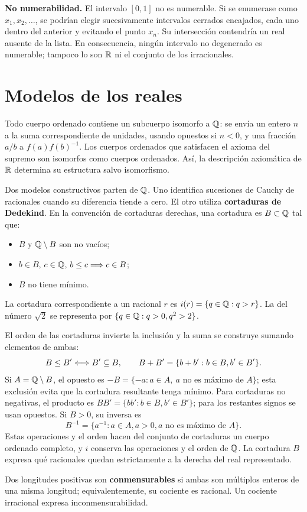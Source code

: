\textbf{No numerabilidad.} El intervalo $[0,1]$ no es numerable.
Si se enumerase como $x_1,x_2,\ldots$, se podrían elegir sucesivamente
intervalos cerrados encajados, cada uno dentro del anterior y evitando
el punto $x_n$. Su intersección contendría un real ausente de la lista.
En consecuencia, ningún intervalo no degenerado es numerable;
tampoco lo son $\mathbb{R}$ ni el conjunto de los irracionales.

\section{Modelos de los reales}
\label{sec:cortaduras}
Todo cuerpo ordenado contiene un subcuerpo isomorfo a $\mathbb{Q}$: se envía
un entero $n$ a la suma correspondiente de unidades, usando opuestos
si $n<0$, y una fracción $a/b$ a $f(a)f(b)^{-1}$.
Los cuerpos ordenados que satisfacen el axioma del supremo son isomorfos
como cuerpos ordenados. Así, la descripción axiomática de $\mathbb{R}$
determina su estructura salvo isomorfismo.

Dos modelos constructivos parten de $\mathbb{Q}$. Uno identifica sucesiones de
Cauchy de racionales cuando su diferencia tiende a cero. El otro utiliza
\textbf{cortaduras de Dedekind}. En la convención de cortaduras derechas,
una cortadura es $B\subset\mathbb{Q}$ tal que:
\begin{itemize}
\item $B$ y $\mathbb{Q}\setminus B$ son no vacíos;
\item $b\in B$, $c\in\mathbb{Q}$, $b\le c\Longrightarrow c\in B$;
\item $B$ no tiene mínimo.
\end{itemize}
La cortadura correspondiente a un racional $r$ es
$i(r)=\{q\in\mathbb{Q}:q>r\}$. La del número $\sqrt2$ se representa por
$\{q\in\mathbb{Q}:q>0, q^2>2\}$.

El orden de las cortaduras invierte la inclusión y la suma se construye
sumando elementos de ambas:
\[
 B\le B'\Longleftrightarrow B'\subseteq B,\qquad
 B+B'=\{b+b':b\in B, b'\in B'\}.
\]
Si $A=\mathbb{Q}\setminus B$, el opuesto es
$-B=\{-a:a\in A,\ a\text{ no es máximo de }A\}$; esta exclusión
evita que la cortadura resultante tenga mínimo.
Para cortaduras no negativas, el producto es
$BB'=\{bb':b\in B,b'\in B'\}$; para los restantes signos se usan
opuestos. Si $B>0$, su inversa es
\[
 B^{-1}=\{a^{-1}:a\in A, a>0,
                       a\text{ no es máximo de }A\}.
\]
Estas operaciones y el orden hacen del conjunto de cortaduras un cuerpo
ordenado completo, y $i$ conserva las operaciones y el orden de $\mathbb{Q}$.
La cortadura $B$ expresa qué racionales quedan estrictamente a la derecha
del real representado.

Dos longitudes positivas son \textbf{conmensurables} si ambas son
múltiplos enteros de una misma longitud; equivalentemente, su cociente
es racional. Un cociente irracional expresa inconmensurabilidad.
